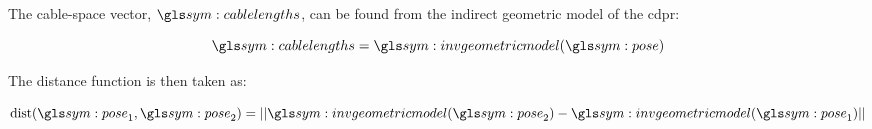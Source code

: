 		The cable-space vector, $\cablelengths$, can be found from the indirect
		geometric model of the \gls{cdpr}:

		\begin{equation}
			\cablelengths = \invgeometricmodel(\pose)
		\end{equation}

		The distance function is then taken as:

		\begin{equation}
			\dist(\pose_1, \pose_2) =
				\norm{%
					\invgeometricmodel(\pose_2) - \invgeometricmodel(\pose_1)
				}
			\label{eq:distance_measure}
		\end{equation}

